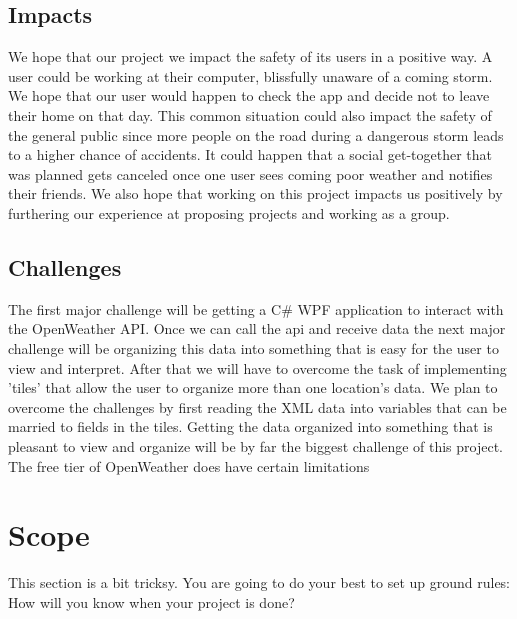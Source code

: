 \documentclass[10pt,conference,onecolumn,compsoc]{IEEEtran}
\begin{document}
\subsection{Impacts}
We hope that our project we impact the safety of its users in a positive way. A user could be working at their computer, blissfully unaware of a coming storm. We hope that our user would happen to check the app and decide not to leave their home on that day. This common situation could also impact the safety of the general public since more people on the road during a dangerous storm leads to a higher chance of accidents. It could happen that a social get-together that was planned gets canceled once one user sees coming poor weather and notifies their friends. We also hope that working on this project impacts us positively by furthering our experience at proposing projects and working as a group.  	



\subsection{Challenges}
	The first major challenge will be getting a C\# WPF application to interact with the OpenWeather API. Once we can call the api and receive data the next major challenge will be organizing this data into something that is easy for the user to view and interpret. After that we will have to overcome the task of implementing 'tiles' that allow the user to organize more than one location's data. We plan to overcome the challenges by first reading the XML data into variables that can be married to fields in the tiles. Getting the data organized into something that is pleasant to view and organize will be by far the biggest challenge of this project. The free tier of OpenWeather does have certain limitations


\section{Scope}
This section is a bit tricksy.  You are going to do your best to set up ground rules:  How will you know when your project is done?
\end{document}
